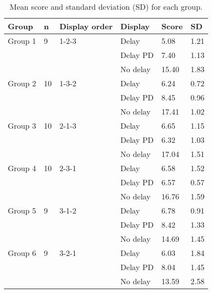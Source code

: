 \begin{table}[]
\small
\centering
\caption{Mean score and standard deviation (SD) for each group.}
\label{groups_score}
\begin{tabularx}{\textwidth}{@{}XXlXXX@{}}
\toprule
Group   & n  & Display order & Display  & Score & SD   \\ \midrule
Group 1 & 9  & 1-2-3         & Delay    & 5.08  & 1.21 \\
        &    &               & Delay PD & 7.40  & 1.13 \\
        &    &               & No delay & 15.40 & 1.83 \\ \addlinespace
Group 2 & 10 & 1-3-2         & Delay    & 6.24  & 0.72 \\
        &    &               & Delay PD & 8.45  & 0.96 \\
        &    &               & No delay & 17.41 & 1.02 \\ \addlinespace
Group 3 & 10 & 2-1-3         & Delay    & 6.65  & 1.15 \\
        &    &               & Delay PD & 6.32  & 1.03 \\
        &    &               & No delay & 17.04 & 1.51 \\ \addlinespace
Group 4 & 10 & 2-3-1         & Delay    & 6.58  & 1.52 \\
        &    &               & Delay PD & 6.57  & 0.57 \\
        &    &               & No delay & 16.76 & 1.59 \\ \addlinespace
Group 5 & 9  & 3-1-2         & Delay    & 6.78  & 0.91 \\
        &    &               & Delay PD & 8.42  & 1.33 \\
        &    &               & No delay & 14.69 & 1.45 \\ \addlinespace
Group 6 & 9  & 3-2-1         & Delay    & 6.03  & 1.84 \\
        &    &               & Delay PD & 8.04  & 1.45 \\
        &    &               & No delay & 13.59 & 2.58 \\ \bottomrule
\end{tabularx}
\end{table}